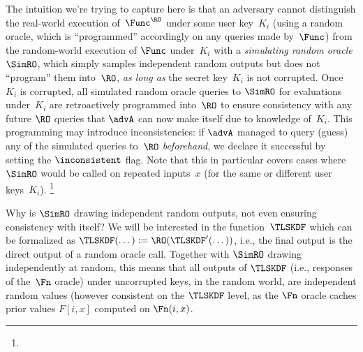 The intuition we're trying to capture here is that an adversary cannot distinguish the real-world execution of~$\Func^\RO$ under some user key~$K_i$ (using a random oracle, which is ``programmed'' accordingly on any queries made by~$\Func$) from the random-world execution of $\Func$ under~$K_i$ with a \emph{simulating random oracle}~$\SimRO$, which simply samples independent random outputs but does not ``program'' them into~$\RO$,
\emph{as long as} the secret key~$K_i$ is not corrupted.
Once $K_i$ is corrupted, all simulated random oracle queries to $\SimRO$ for evaluations under~$K_i$ are retroactively programmed into~$\RO$ to ensure consistency with any future $\RO$ queries that $\advA$ can now make itself due to knowledge of~$K_i$.
This programming may introduce inconsistencies:
if $\advA$ managed to query (guess) any of the simulated queries to~$\RO$ \emph{beforehand}, we declare it successful by setting the $\inconsistent$ flag.
Note that this in particular covers cases where $\SimRO$ would be called on repeated inputs~$x$ (for the same or different user keys~$K_i$).%
\footnote{}

Why is $\SimRO$ drawing independent random outputs, not even ensuring consistency with itself?
We will be interested in the function~$\TLSKDF$ which can be formalized as $\TLSKDF(\dots) := \RO(\TLSKDF'(\dots))$, i.e., the final output is the direct output of a random oracle call.
Together with $\SimRO$ drawing independently at random, this means that all outputs of $\TLSKDF$ (i.e., responses of the~$\Fn$ oracle) under uncorrupted keys, in the random world, are independent random values (however consistent on the $\TLSKDF$ level, as the $\Fn$ oracle caches prior values $F[i,x]$ computed on $\Fn(i,x)$.

\fi

